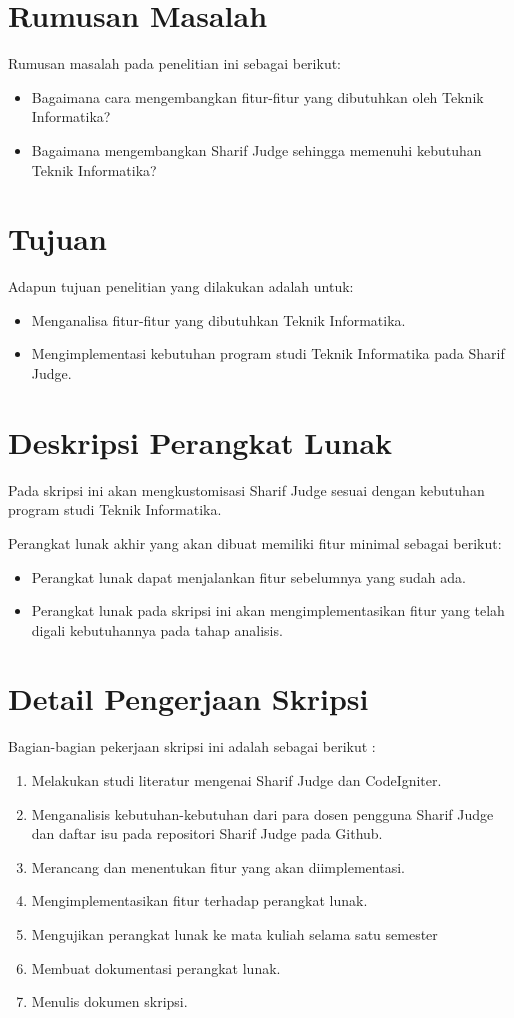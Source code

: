\documentclass[a4paper,twoside]{article}
\begin{document}
\section{Rumusan Masalah}
Rumusan masalah pada penelitian ini sebagai berikut:
\begin{itemize}
	\item Bagaimana cara mengembangkan fitur-fitur yang dibutuhkan oleh Teknik Informatika? 
	\item Bagaimana mengembangkan Sharif Judge sehingga memenuhi kebutuhan Teknik Informatika?
\end{itemize}

\section{Tujuan}
Adapun tujuan penelitian yang dilakukan adalah untuk:
\begin{itemize}
	\item Menganalisa fitur-fitur yang dibutuhkan Teknik Informatika.
	\item Mengimplementasi kebutuhan program studi Teknik Informatika pada Sharif Judge.
	\pagebreak
\end{itemize}

\section{Deskripsi Perangkat Lunak}
Pada skripsi ini akan mengkustomisasi Sharif Judge sesuai dengan kebutuhan program studi Teknik Informatika.

Perangkat lunak akhir yang akan dibuat memiliki fitur minimal sebagai berikut:
\begin{itemize}
	\item Perangkat lunak dapat menjalankan fitur sebelumnya yang sudah ada.
	\item Perangkat lunak pada skripsi ini akan mengimplementasikan fitur yang telah digali kebutuhannya pada tahap analisis.
		
\end{itemize}

\section{Detail Pengerjaan Skripsi}
Bagian-bagian pekerjaan skripsi ini adalah sebagai berikut :
	\begin{enumerate}
		\item Melakukan studi literatur mengenai Sharif Judge dan CodeIgniter.
		\item Menganalisis kebutuhan-kebutuhan dari para dosen pengguna Sharif Judge dan daftar isu pada repositori Sharif Judge pada Github.
		\item Merancang dan menentukan fitur yang akan diimplementasi.
		\item Mengimplementasikan fitur terhadap perangkat lunak.
		\item Mengujikan perangkat lunak ke mata kuliah selama satu semester
		\item Membuat dokumentasi perangkat lunak.
		\item Menulis dokumen skripsi.
	\end{enumerate}
\end{document}

